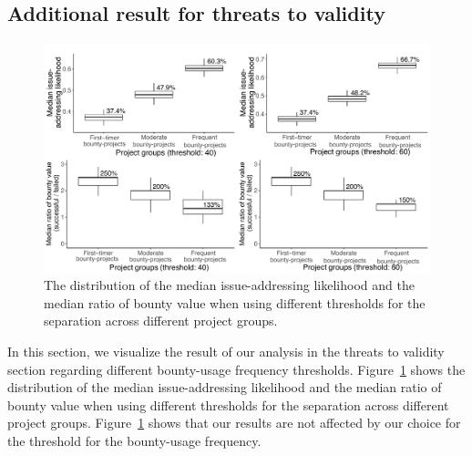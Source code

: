 \documentclass[10pt,journal,compsoc]{IEEEtran}
\begin{document}
\begin{appendices}
      \section{Additional result for threats to validity}

      \begin{figure}[th]
        \centering\includegraphics[width=\textwidth ]{pics/threat/threat}
        \caption{The distribution of the median issue-addressing likelihood and the median ratio of bounty value when using different thresholds for the separation across different project groups.}
        \label{fig:threat}
      \end{figure}
      In this section, we visualize the result of our analysis in the threats to validity section regarding different bounty-usage frequency thresholds. Figure~\ref{fig:threat} shows  the distribution of the median issue-addressing likelihood and the median ratio of bounty value when using different thresholds for the separation across different project groups. Figure~\ref{fig:threat} shows that our results are not affected by our choice for the threshold for the bounty-usage frequency.

      \balance
      
      {
      \footnotesize
      
      }
  \end{appendices}
\end{document}
